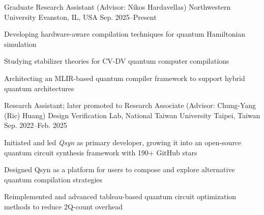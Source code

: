 

\begin{cventries}

    \cventry
        {Graduate Research Assistant (Advisor: Nikos Hardavellas)}
        {Northwestern University}
        {Evanston, IL, USA}
        {Sep. 2025--Present}
        {
            \begin{cvitems}
                \item Developing hardware-aware compilation techniques for quantum Hamiltonian simulation 
                \item Studying stabilizer theories for CV-DV quantum computer compilations
                \item Architecting an MLIR-based quantum compiler framework to support hybrid quantum architectures
            \end{cvitems}
        }
    
     \cventry
        {Research Assistant; later promoted to Research Associate (Advisor: Chung-Yang (Ric) Huang)}
        {Design Verification Lab, National Taiwan University}
        {Taipei, Taiwan}
        {Sep. 2022--Feb. 2025}
        {
            \begin{cvitems}
                \item Initiated and led \emph{Qsyn} as primary developer, growing it into an open-source quantum circuit synthesis framework with 190+ GitHub stars
                \item Designed Qsyn as a platform for users to compose and explore alternative quantum compilation strategies
                \item Reimplemented and advanced tableau-based quantum circuit optimization methods to reduce 2Q-count overhead
            \end{cvitems}
        }    
\end{cventries}
